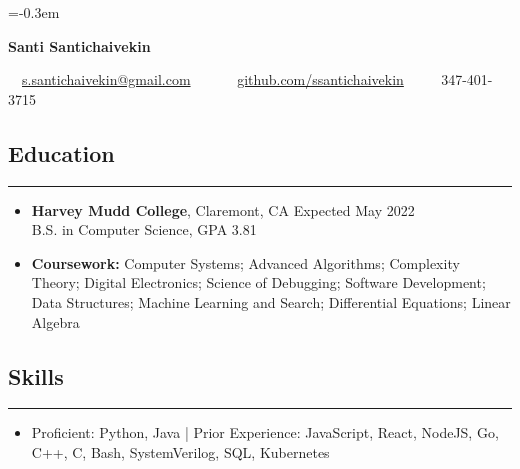 \documentclass[10pt,letterpaper]{article}
\begin{document}
\fontsize{9.0}{11}\selectfont
\parskip=-0.3em

\begin{center}
{\Large \textbf{Santi Santichaivekin}}

\ \ \href{mailto:s.santichaivekin@gmail.com}{s.santichaivekin@gmail.com}\ \ 
\ \ \textbullet
\ \ \href{https://github.com/ssantichaivekin}{github.com/ssantichaivekin}
\ \ \textbullet
\ \ 347-401-3715

\end{center}

\subsection*{Education}
\vspace{-0.2em}
\hrule
\vspace{1em}
  \begin{itemize}[label={},leftmargin=*]
    \setlength\itemsep{0.8em}
    \parskip=-0.2em
    \item
    \textbf{Harvey Mudd College}, Claremont, CA \hfill
    Expected May 2022\\
    B.S. in Computer Science, GPA 3.81
    \item \textbf{Coursework:}
  Computer Systems;
  Advanced Algorithms; 
  Complexity Theory;
  Digital Electronics;
  Science of Debugging;
  Software Development;
  Data Structures;
  Machine Learning and Search;
  Differential Equations;
  Linear Algebra
  \end{itemize}

\subsection*{Skills}
\vspace{-0.2em}
\hrule
\vspace{1em}
\begin{itemize}[label={},leftmargin=*]
\parskip=-0.25em
\item[]
Proficient:
  Python,
  Java
|
Prior Experience:
  JavaScript, 
  React, NodeJS,
  Go,
  C++,
  C,
  Bash,
  SystemVerilog,
  SQL,
  Kubernetes
    
\end{itemize}
\end{document}
